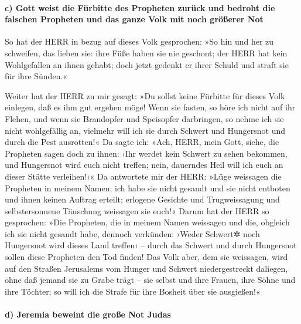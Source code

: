 \hypertarget{c-gott-weist-die-fuxfcrbitte-des-propheten-zuruxfcck-und-bedroht-die-falschen-propheten-und-das-ganze-volk-mit-noch-gruxf6uxdferer-not}{%
\paragraph{c) Gott weist die Fürbitte des Propheten zurück und bedroht
die falschen Propheten und das ganze Volk mit noch größerer
Not}\label{c-gott-weist-die-fuxfcrbitte-des-propheten-zuruxfcck-und-bedroht-die-falschen-propheten-und-das-ganze-volk-mit-noch-gruxf6uxdferer-not}}

So hat der HERR in bezug auf dieses Volk gesprochen: »So
hin und her zu schweifen, das lieben sie: ihre Füße haben sie nie
geschont; der HERR hat kein Wohlgefallen an ihnen gehabt; doch jetzt
gedenkt er ihrer Schuld und straft sie für ihre Sünden.«

Weiter hat der HERR zu mir gesagt: »Du sollst keine
Fürbitte für dieses Volk einlegen, daß es ihm gut ergehen möge!
Wenn sie fasten, so höre ich nicht auf ihr Flehen, und
wenn sie Brandopfer und Speisopfer darbringen, so nehme ich sie nicht
wohlgefällig an, vielmehr will ich sie durch Schwert und Hungersnot und
durch die Pest ausrotten!« Da sagte ich: »Ach, HERR, mein
Gott, siehe, die Propheten sagen doch zu ihnen: ›Ihr werdet kein Schwert
zu sehen bekommen, und Hungersnot wird euch nicht treffen; nein,
dauerndes Heil will ich euch an dieser Stätte verleihen!‹«
Da antwortete mir der HERR: »Lüge weissagen die Propheten
in meinem Namen; ich habe sie nicht gesandt und sie nicht entboten und
ihnen keinen Auftrag erteilt; erlogene Gesichte und Trugweissagung und
selbstersonnene Täuschung weissagen sie euch!« Darum hat
der HERR so gesprochen: »Die Propheten, die in meinem Namen weissagen
und die, obgleich ich sie nicht gesandt habe, dennoch verkünden: ›Weder
Schwert✲ noch Hungersnot wird dieses Land treffen‹ -- durch das Schwert
und durch Hungersnot sollen diese Propheten den Tod finden!
Das Volk aber, dem sie weissagen, wird auf den Straßen
Jerusalems vom Hunger und Schwert niedergestreckt daliegen, ohne daß
jemand sie zu Grabe trägt -- sie selbst und ihre Frauen, ihre Söhne und
ihre Töchter; so will ich die Strafe für ihre Bosheit über sie
ausgießen!«

\hypertarget{d-jeremia-beweint-die-grouxdfe-not-judas}{%
\paragraph{d) Jeremia beweint die große Not
Judas}\label{d-jeremia-beweint-die-grouxdfe-not-judas}}

